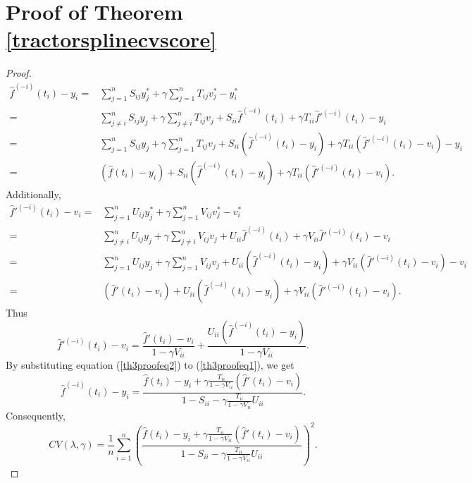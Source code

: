 \section{Proof of Theorem \ref{tractorsplinecvscore}}

\begin{proof}
\begin{equation}\label{th3proofeq1}
\begin{split}
\hat{f}^{(-i)}(t_i)-y_i=& \sum_{j=1}^{n}S_{ij}y_j^*+ \gamma \sum_{j=1}^{n}T_{ij}v_j^*-y_i^*\\
=&\sum_{j\neq i}^{n}S_{ij}y_j+ \gamma \sum_{j\neq i}^{n}T_{ij}v_j+S_{ii}\hat{f}^{(-i)}(t_i)+\gamma T_{ii}\hat{f}'^{(-i)}(t_i)-y_i\\
=&\sum_{j=1}^{n}S_{ij}y_j+ \gamma \sum_{j=1}^{n}T_{ij}v_j+S_{ii}(\hat{f}^{(-i)}(t_i)-y_i)+\gamma T_{ii}(\hat{f}'^{(-i)}(t_i)-v_i)-y_i\\
=&(\hat{f}(t_i)-y_i)+S_{ii}(\hat{f}^{(-i)}(t_i)-y_i)+\gamma T_{ii}(\hat{f}'^{(-i)}(t_i)-v_i).
\end{split}
\end{equation}
Additionally, 
\begin{equation}
\begin{split}
\hat{f}'^{(-i)}(t_i)-v_i=& \sum_{j=1}^{n}U_{ij}y_j^*+ \gamma \sum_{j=1}^{n}V_{ij}v_j^*-v_i^*\\
=&\sum_{j\neq i}^{n}U_{ij}y_j+ \gamma \sum_{j\neq i}^{n}V_{ij}v_j+U_{ii}\hat{f}^{(-i)}(t_i)+\gamma V_{ii}\hat{f}'^{(-i)}(t_i)-v_i\\
=&\sum_{j=1}^{n}U_{ij}y_j+ \gamma \sum_{j=1}^{n}V_{ij}v_j+U_{ii}(\hat{f}^{(-i)}(t_i)-y_i)+\gamma V_{ii}(\hat{f}'^{(-i)}(t_i)-v_i)-v_i\\
=&(\hat{f}'(t_i)-v_i)+U_{ii}(\hat{f}^{(-i)}(t_i)-y_i)+\gamma V_{ii}(\hat{f}'^{(-i)}(t_i)-v_i).
\end{split}
\end{equation}
Thus 
\begin{equation}\label{th3proofeq2}
\hat{f}'^{(-i)}(t_i)-v_i = \frac{\hat{f}'(t_i)-v_i}{1-\gamma V_{ii}}+ \frac{U_{ii}(\hat{f}^{(-i)}(t_i)-y_i)}{1-\gamma V_{ii}}.
\end{equation}
By substituting equation (\ref{th3proofeq2}) to (\ref{th3proofeq1}), we get
\begin{equation*}
\hat{f}^{(-i)}(t_i)-y_i=\frac{\hat{f}(t_i)-y_i+\gamma \frac{T_{ii}}{1-\gamma V_{ii}}(\hat{f}'(t_i)-v_i)}{1-S_{ii}-\gamma\frac{T_{ii}}{1-\gamma V_{ii}}U_{ii}}.
\end{equation*}
Consequently, 
\begin{equation*}
CV(\lambda,\gamma)=\frac{1}{n}\sum_{i=1}^{n}\left( \frac{\hat{f}(t_i)-y_i+\gamma \frac{T_{ii}}{1-\gamma V_{ii}}(\hat{f}'(t_i)-v_i)}{1-S_{ii}-\gamma\frac{T_{ii}}{1-\gamma V_{ii}}U_{ii}}\right)^2.
\end{equation*}
\end{proof}


